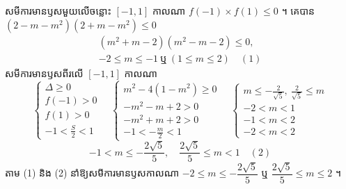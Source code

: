 សមីការមានឫសមួយលើចន្លោះ $[-1, 1]$ កាលណា $f(-1) \times f(1) \le 0$ ។ គេបាន $(2 - m - m^2)(2 + m - m^2) \le 0$
\[
\begin{gathered}
(m^2 + m - 2)(m^2 - m - 2) \le 0,\\
-2 \le m \le -1 \ \text{ឬ} \ (1 \le m \le 2) \quad (1)
\end{gathered}
\]
សមីការមានឫសពីរលើ $[-1, 1]$ កាលណា
\[
\begin{cases} \Delta \ge 0\\ f(-1) > 0\\ f(1) > 0\\ -1 < \frac{S}{2} < 1 \end{cases}
\quad
\begin{cases} m^2 - 4(1 - m^2) \ge 0\\ -m^2 - m + 2 > 0\\ -m^2 + m + 2 > 0\\ -1 < -\frac{m}{2} < 1 \end{cases}
\quad
\begin{cases} m \le -\frac{2}{\sqrt{5}}, \ \frac{2}{\sqrt{5}} \le m\\ -2 < m < 1\\ -1 < m < 2\\ -2 < m < 2 \end{cases}
\]
\[ -1 < m \le -\frac{2\sqrt{5}}{5}, \quad \frac{2\sqrt{5}}{5} \le m < 1 \quad (2) \]
តាម (1) និង (2) នាំឱ្យសមីការមានឫសកាលណា $-2 \le m \le -\dfrac{2\sqrt{5}}{5}$ ឬ $\dfrac{2\sqrt{5}}{5} \le m \le 2$ ។

